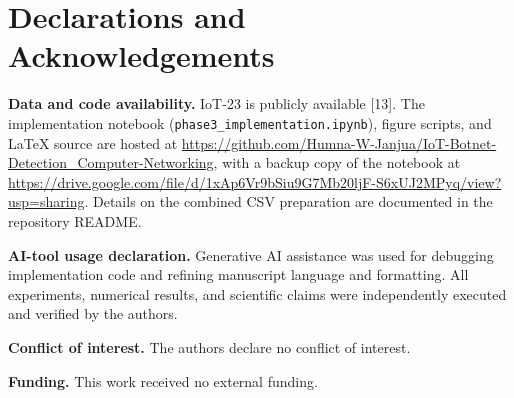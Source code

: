 \section*{Declarations and Acknowledgements}

\noindent\textbf{Data and code availability.} IoT-23 is publicly available [13]. The implementation notebook (\texttt{phase3\_implementation.ipynb}), figure scripts, and \LaTeX{} source are hosted at \url{https://github.com/Humna-W-Janjua/IoT-Botnet-Detection_Computer-Networking}, with a backup copy of the notebook at \url{https://drive.google.com/file/d/1xAp6Vr9bSiu9G7Mb20ljF-S6xUJ2MPyq/view?usp=sharing}. Details on the combined CSV preparation are documented in the repository README.

\noindent\textbf{AI-tool usage declaration.} Generative AI assistance was used for debugging implementation code and refining manuscript language and formatting. All experiments, numerical results, and scientific claims were independently executed and verified by the authors.

\noindent\textbf{Conflict of interest.} The authors declare no conflict of interest.

\noindent\textbf{Funding.} This work received no external funding.

